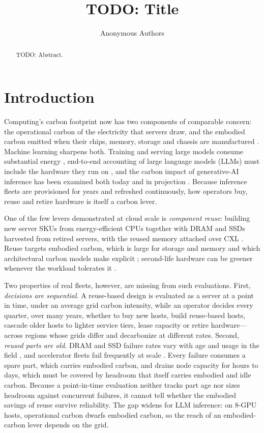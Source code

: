 \documentclass[11pt]{article}
\title{TODO: Title}
\author{Anonymous Authors}
\date{}
\begin{document}
\maketitle

\begin{abstract}
TODO: Abstract.
\end{abstract}

\section{Introduction}
Computing's carbon footprint now has two components of comparable concern: the operational carbon of the electricity that servers draw, and the embodied carbon emitted when their chips, memory, storage and chassis are manufactured \citep{gupta2022chasing,gupta2022act}. Machine learning sharpens both. Training and serving large models consume substantial energy \citep{strubell2019energy,patterson2021carbon,wu2022sustainableai}, end-to-end accounting of large language models (LLMs) must include the hardware they run on \citep{luccioni2023bloom,faiz2024llmcarbon}, and the carbon impact of generative-AI inference has been examined both today and in projection \citep{chien2023genai}. Because inference fleets are provisioned for years and refreshed continuously, how operators buy, reuse and retire hardware is itself a carbon lever.

One of the few levers demonstrated at cloud scale is \emph{component reuse}: building new server SKUs from energy-efficient CPUs together with DRAM and SSDs harvested from retired servers, with the reused memory attached over CXL \citep{wang2024greensku}. Reuse targets embodied carbon, which is large for storage and memory \citep{tannu2023ssd} and which architectural carbon models make explicit \citep{gupta2022act}; second-life hardware can be greener whenever the workload tolerates it \citep{switzer2023junkyard}.

Two properties of real fleets, however, are missing from such evaluations. First, \emph{decisions are sequential}. A reuse-based design is evaluated as a server at a point in time, under an average grid carbon intensity, while an operator decides every quarter, over many years, whether to buy new hosts, build reuse-based hosts, cascade older hosts to lighter service tiers, lease capacity or retire hardware---across regions whose grids differ and decarbonize at different rates. Second, \emph{reused parts are old}. DRAM and SSD failure rates vary with age and usage in the field \citep{schroeder2009dram,meza2015dram,schroeder2016flash}, and accelerator fleets fail frequently at scale \citep{llama3,kokolis2025reliability}. Every failure consumes a spare part, which carries embodied carbon, and drains node capacity for hours to days, which must be covered by headroom that itself carries embodied and idle carbon. Because a point-in-time evaluation neither tracks part age nor sizes headroom against concurrent failures, it cannot tell whether the embodied savings of reuse survive reliability. The gap widens for LLM inference: on 8-GPU hosts, operational carbon dwarfs embodied carbon, so the reach of an embodied-carbon lever depends on the grid.
\end{document}
